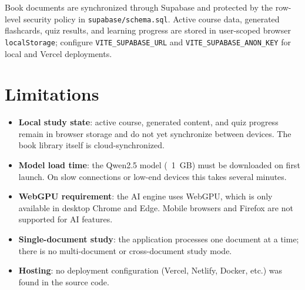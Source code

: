 \documentclass[12pt,a4paper]{article}
\begin{document}
Book documents are synchronized through Supabase and protected by the row-level
security policy in \texttt{supabase/schema.sql}. Active course data, generated
flashcards, quiz results, and learning progress are stored in user-scoped browser
\texttt{localStorage}; configure \texttt{VITE\_SUPABASE\_URL} and
\texttt{VITE\_SUPABASE\_ANON\_KEY} for local and Vercel deployments.

\section{Limitations}

\begin{itemize}[leftmargin=*]
  \item \textbf{Local study state}: active course, generated content, and quiz
        progress remain in browser storage and do not yet synchronize between
        devices. The book library itself is cloud-synchronized.
  \item \textbf{Model load time}: the Qwen2.5 model (~1~GB) must be downloaded
        on first launch. On slow connections or low-end devices this takes several
        minutes.
  \item \textbf{WebGPU requirement}: the AI engine uses WebGPU, which is only
        available in desktop Chrome and Edge. Mobile browsers and Firefox are not
        supported for AI features.
  \item \textbf{Single-document study}: the application processes one document at
        a time; there is no multi-document or cross-document study mode.
  \item \textbf{Hosting}: no deployment configuration (Vercel, Netlify, Docker,
        etc.) was found in the source code.
\end{itemize}
\end{document}
